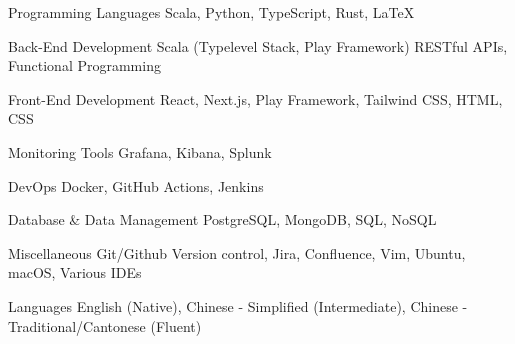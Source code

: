 
\begin{sloppypar} %
\small %
\begin{cvskills}

  \cvskill
  {Programming Languages} 
  {Scala, Python, TypeScript, Rust, LaTeX}

  \cvskill
  {Back-End Development} 
  {Scala (Typelevel Stack, Play Framework) RESTful APIs, Functional Programming} 

  \cvskill
  {Front-End Development} 
  {React, Next.js, Play Framework, Tailwind CSS, HTML, CSS}

\cvskill
  {Monitoring Tools} 
  {Grafana, Kibana, Splunk} 

  \cvskill
  {DevOps} 
  {Docker, GitHub Actions, Jenkins}

  \cvskill
  {Database \& Data Management} 
  {PostgreSQL, MongoDB, SQL, NoSQL}

\cvskill
  {Miscellaneous} 
  {Git/Github Version control, Jira, Confluence, Vim, Ubuntu, macOS, Various IDEs} 

  \cvskill
  {Languages} 
  {English (Native), Chinese - Simplified (Intermediate), Chinese - Traditional/Cantonese (Fluent)}

\end{cvskills}
\normalsize
\end{sloppypar}
